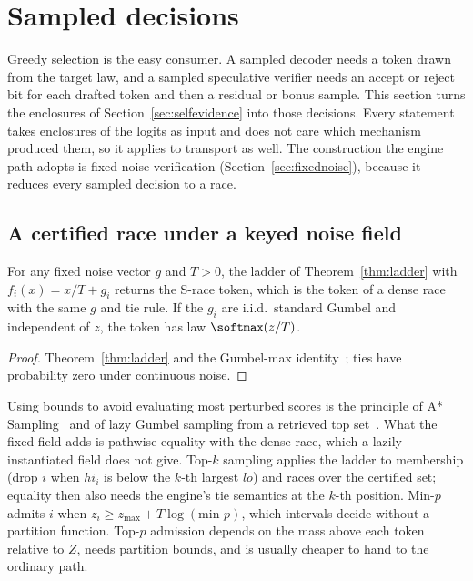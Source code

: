 \section{Sampled decisions}\label{sec:decisions}
Greedy selection is the easy consumer. A sampled decoder needs a token drawn from the target law, and a sampled speculative verifier needs an accept or reject bit for each drafted token and then a residual or bonus sample. This section turns the enclosures of Section~\ref{sec:selfevidence} into those decisions. Every statement takes enclosures of the logits as input and does not care which mechanism produced them, so it applies to transport as well. The construction the engine path adopts is fixed-noise verification (Section~\ref{sec:fixednoise}), because it reduces every sampled decision to a race.

\subsection{A certified race under a keyed noise field}\label{sec:race}
\begin{theorem}\label{thm:race}
For any fixed noise vector $g$ and $T>0$, the ladder of Theorem~\ref{thm:ladder} with $f_i(x)=x/T+g_i$ returns the S-race token, which is the token of a dense race with the same $g$ and tie rule. If the $g_i$ are i.i.d.\ standard Gumbel and independent of $z$, the token has law $\softmax(z/T)$.
\end{theorem}
\begin{proof}
Theorem~\ref{thm:ladder} and the Gumbel-max identity~\cite{gumbel1954,papandreou2011}; ties have probability zero under continuous noise.
\end{proof}
Using bounds to avoid evaluating most perturbed scores is the principle of A* Sampling~\cite{astar} and of lazy Gumbel sampling from a retrieved top set~\cite{mussmann2017}. What the fixed field adds is pathwise equality with the dense race, which a lazily instantiated field does not give. Top-$k$ sampling applies the ladder to membership (drop $i$ when $hi_i$ is below the $k$-th largest $lo$) and races over the certified set; equality then also needs the engine's tie semantics at the $k$-th position. Min-$p$ admits $i$ when $z_i\ge z_{\max}+T\log(\text{min-}p)$, which intervals decide without a partition function. Top-$p$ admission depends on the mass above each token relative to $Z$, needs partition bounds, and is usually cheaper to hand to the ordinary path.

